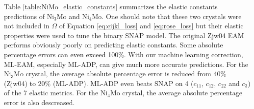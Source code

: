 \documentclass[prb,reprint]{revtex4-2}
\begin{document}
Table \ref{table:NiMo_elastic_constants} summarizes the elastic constants 
predictions of Ni$_3$Mo and Ni$_4$Mo. One should note that these two crystals 
were not included in $\Omega$ of Equation \ref{eq:cijkl_loss} and 
\ref{eq:rose_loss} but their elastic properties were used to tune the binary 
SNAP model. The original Zjw04 EAM performs obviously poorly on predicting 
elastic constants. Some absolute percentage errors can even exceed 100\%. With 
our machine learning correction, ML-EAM, especially ML-ADP, can give much more  
accurate predictions. For the Ni$_3$Mo crystal, the average absolute percentage 
error is reduced from 40\% (Zjw04) to 20\% (ML-ADP). ML-ADP even beats SNAP on 4 
($c_{11}$, $c_{12}$, $c_{22}$ and $c_{3}$) of the 7 elastic metrics. For the 
Ni$_4$Mo crystal, the average absolute percentage error is also descreased. 
\end{document}
